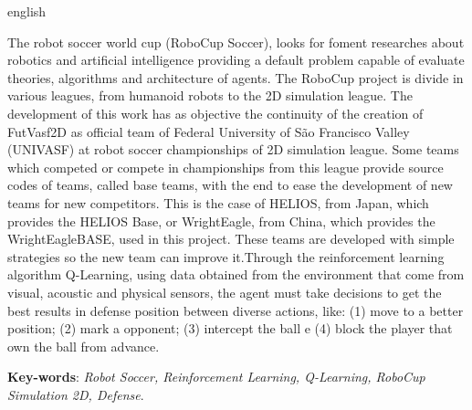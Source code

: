 \begin{resumo}[Abstract]
\begin{otherlanguage*}{english}

The robot soccer world cup (RoboCup Soccer), looks for foment researches about robotics and artificial intelligence providing a default problem capable of evaluate theories, algorithms and architecture of agents. The RoboCup project is divide in various leagues, from humanoid robots to the 2D simulation league. The development of this work has as objective the continuity of the creation of FutVasf2D as official team of Federal University of São Francisco Valley (UNIVASF) at robot soccer championships of 2D simulation league. Some teams which competed or compete in championships from this league provide source codes of teams, called base teams, with the end to ease the development of new teams for new competitors. This is the case of HELIOS, from Japan, which provides the HELIOS Base, or WrightEagle, from China, which provides the WrightEagleBASE, used in this project. These teams are developed with simple strategies so the new team can improve it.Through the reinforcement learning algorithm Q-Learning,  using data obtained from the environment that come from visual, acoustic and physical sensors, the agent must take decisions to get the best results in defense position between diverse actions, like: (1) move to a better position; (2) mark a opponent; (3) intercept the ball e (4) block the player that own the ball from advance.
	
	\vspace{\onelineskip}

	\noindent
	\textbf{Key-words}: \textit{Robot Soccer, Reinforcement Learning, Q-Learning, RoboCup Simulation 2D, Defense}.

\end{otherlanguage*}
\end{resumo}


